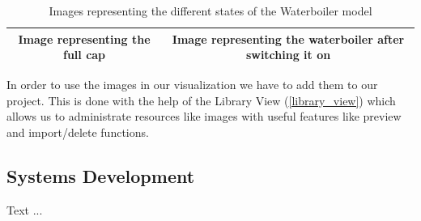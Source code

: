 \begin{table}[h!]
\begin{center}
\begin{tabular}{ | c | c |}
	Image representing the full cap & Image representing the waterboiler after switching it on   \\ \hline
    \end{tabular}
\caption{Images representing the different states of the Waterboiler model}
\label{table_tut_04_waterboilerimages}
\end{center}
\end{table}

In order to use the images in our visualization we have to add them to our project. This is done with the help of the Library View (\ref{library_view}) which allows us to administrate resources like images with useful features like preview and import/delete functions. 

\subsection{Systems Development}

Text ...
